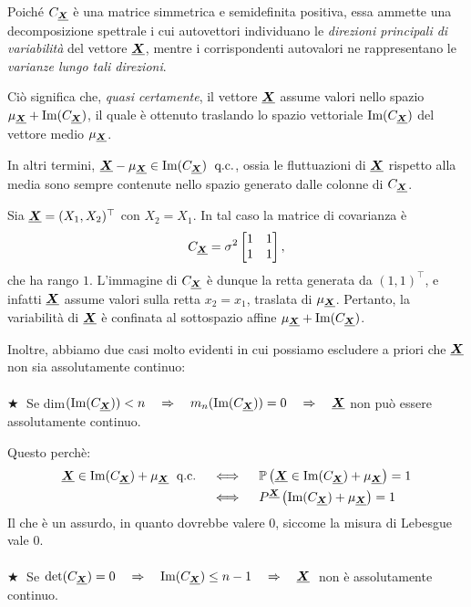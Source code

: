 Poiché $C_{\underline{{\boldsymbol{X}}}}$ è una matrice simmetrica e semidefinita positiva, essa ammette una decomposizione spettrale i cui autovettori individuano le \emph{direzioni principali di variabilità} del vettore $\underline{{\boldsymbol{X}}}$, mentre i corrispondenti autovalori ne rappresentano le \emph{varianze lungo tali direzioni}.

\medskip
Ciò significa che, \emph{quasi certamente}, il vettore $\underline{{\boldsymbol{X}}}$ assume valori nello spazio $\mu_{\underline{{\boldsymbol{X}}}} + \text{Im}(C_{\underline{{\boldsymbol{X}}}})$, il quale è ottenuto traslando lo spazio vettoriale $\text{Im}(C_{\underline{{\boldsymbol{X}}}})$ del vettore medio $\mu_{\underline{{\boldsymbol{X}}}}$.

\medskip
\noindent In altri termini, $\underline{{\boldsymbol{X}}} - \mu_{\underline{{\boldsymbol{X}}}} \in \text{Im}(C_{\underline{{\boldsymbol{X}}}})\;\text{ q.c.}$, ossia le fluttuazioni di $\underline{{\boldsymbol{X}}}$ rispetto alla media sono sempre contenute nello spazio generato dalle colonne di $C_{\underline{{\boldsymbol{X}}}}$.
\begin{esempio}
    Sia $\underline{{\boldsymbol{X}}} = (X_1, X_2)^{\top}$ con $X_2 = X_1$. 
In tal caso la matrice di covarianza è
\[
C_{\underline{{\boldsymbol{X}}}} = \sigma^2 
\begin{bmatrix}
1 & 1\\
1 & 1
\end{bmatrix},
\]
che ha rango $1$. L'immagine di $C_{\underline{{\boldsymbol{X}}}}$ è dunque la retta generata da $(1,1)^{\top}$, e infatti $\underline{{\boldsymbol{X}}}$ assume valori sulla retta $x_2 = x_1$, traslata di $\mu_{\underline{{\boldsymbol{X}}}}$. 
Pertanto, la variabilità di $\underline{{\boldsymbol{X}}}$ è confinata al sottospazio affine
$\mu_{\underline{{\boldsymbol{X}}}} + \text{Im}(C_{\underline{{\boldsymbol{X}}}})$.
\end{esempio}

\noindent Inoltre, abbiamo due casi molto evidenti in cui possiamo escludere a priori che $\underline{{\boldsymbol{X}}}$ non sia assolutamente continuo:\\
\\
\(\bigstar \;\) Se dim$(\text{Im}(C_{\underline{{\boldsymbol{X}}}}))<n \quad \Rightarrow \quad m_n(\text{Im}(C_{\underline{{\boldsymbol{X}}}})) = 0 \quad \Rightarrow \quad \underline{{\boldsymbol{X}}}$ non può essere assolutamente continuo.

\medskip
\noindent Questo perchè:
\begin{align*}
    \underline{{\boldsymbol{X}}} \in \text{Im}(C_{\underline{{\boldsymbol{X}}}})+\mu_{\underline{{\boldsymbol{X}}}}\; \text{ q.c.} \quad &\iff \quad \mathbb{P}\left(\underline{{\boldsymbol{X}}} \in \text{Im}(C_{\underline{{\boldsymbol{X}}}})+\mu_{\underline{{\boldsymbol{X}}}}\right) = 1\\
    &\iff \quad P^{\underline{{\boldsymbol{X}}}}\left(\text{Im}(C_{\underline{{\boldsymbol{X}}}})+\mu_{\underline{{\boldsymbol{X}}}}\right) = 1
\end{align*}
Il che è un assurdo, in quanto dovrebbe valere $0$, siccome la misura di Lebesgue vale $0$.\\
\\
\(\bigstar \;\) Se $\det(C_{\underline{{\boldsymbol{X}}}}) = 0 \quad \Rightarrow \quad \text{Im}(C_{\underline{{\boldsymbol{X}}}})\leq n-1\quad \Rightarrow \quad \underline{{\boldsymbol{X}}}\;$ non è assolutamente continuo.

